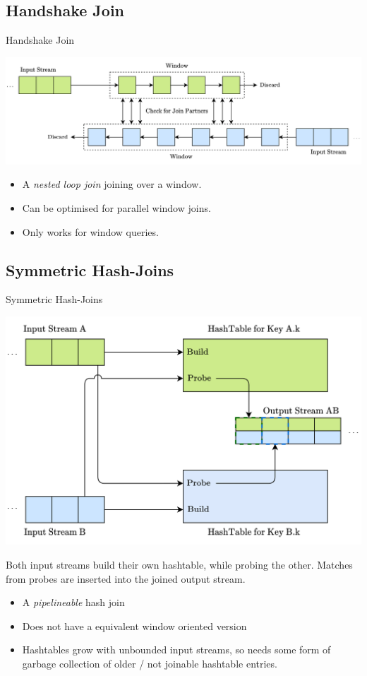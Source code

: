 \subsection{Handshake Join}
\begin{definitionbox}{Handshake Join}
    \begin{center}
        \includegraphics[width=\textwidth]{streams/images/handshake_join.drawio.png}
    \end{center}
    \begin{itemize}
        \item A \textit{nested loop join} joining over a window.
        \item Can be optimised for parallel window joins.
        \item Only works for window queries.
    \end{itemize}
\end{definitionbox}

\subsection{Symmetric Hash-Joins}
\begin{definitionbox}{Symmetric Hash-Joins}
    \begin{center}
        \includegraphics[width=.7\textwidth]{streams/images/symmetric_hash_join.drawio.png}
    \end{center}
    Both input streams build their own hashtable, while probing the other. Matches from probes are inserted into the joined output stream.
    \begin{itemize}
        \item A \textit{pipelineable} hash join
        \item Does not have a equivalent window oriented version
        \item Hashtables grow with unbounded input streams, so needs some form of garbage collection of older / not joinable hashtable entries.
    \end{itemize}
\end{definitionbox}


